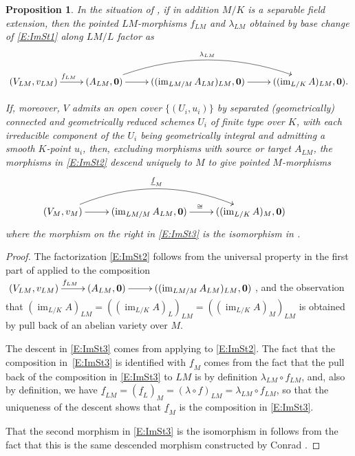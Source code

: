 \documentclass[11pt, reqno]{amsart}
\numberwithin{equation}{section}
\newtheorem{pro}[teo]{Proposition}
\theoremstyle{definition}
\theoremstyle{remark}
\DeclareMathOperator{\im}{im}
\def\iso{\cong}
\newcommand{\ubar}[1]{{\underline{#1}}}
\begin{document}
\begin{pro}\label{C:ImAbVarSt}
 In the situation of , 
  if in addition $M/K$ is a separable field extension, then the pointed $LM$-morphisms $f_{LM}$ and $\lambda_{LM}$ obtained by base change of \eqref{E:ImSt1} along $LM/L$ factor as 
\begin{equation}\label{E:ImSt2}
\xymatrix{
(V_{LM},v_{LM})\ar[r]^{f_{LM}} & (A_{LM},\mathbf 0) \ar@/^2pc/[rr]^<>(0.5){\lambda_{LM}}  \ar[r]& (( \im_{LM/M} A_{LM})_{LM},\mathbf 0)  \ar[r]&((\im_{L/K}A)_{LM},\mathbf 0).
}
\end{equation}

 If, moreover, $V$ admits an open cover $\{(U_i,u_i)\}$ by separated  (geometrically) connected
  and geometrically reduced schemes $U_i$ of finite type over $K$, with each irreducible component of the $U_i$ being geometrically integral and admitting a smooth $K$-point $u_i$,
  then, 
excluding morphisms with source or target $A_{LM}$,  the morphisms  in \eqref{E:ImSt2} descend uniquely to $M$ to give pointed $M$-morphisms 
\begin{equation}\label{E:ImSt3}
\xymatrix{
(V_{M},v_{M})\ar[r] \ar@/^2pc/[rr]^{\ubar f_M} & ( \im_{LM/M} A_{LM},\mathbf 0)  \ar[r]^\iso&((\im_{L/K}A)_{M},\mathbf 0)& 
}
\end{equation}
where the morphism on the right in \eqref{E:ImSt3} is the isomorphism in .
  \end{pro}
  
  
\begin{proof}
The factorization \eqref{E:ImSt2} follows from the universal property
in the first part of   applied to the composition 
$
\xymatrix{
(V_{LM},v_{LM})\ar[r]^{f_{LM}} & (A_{LM},\mathbf 0)  \ar[r]& (( \im_{LM/M} A_{LM})_{LM},\mathbf 0) }
$, and the observation that $(\im_{L/K}A)_{LM}= ((\im_{L/K}A)_{L})_{LM}= ((\im_{L/K}A)_{M})_{LM}$ is obtained by pull back of an abelian variety over $M$.  

The descent in \eqref{E:ImSt3} comes from applying   to \eqref{E:ImSt2}.   
The fact that the composition in~\eqref{E:ImSt3} is identified with $\ubar f_M$ comes from the fact that the pull back of the composition in \eqref{E:ImSt3} to $LM$ is by definition  $\lambda_{LM}\circ f_{LM}$, and, also by definition, we have $\ubar f_{LM} =(\ubar f_L)_M=(\lambda \circ f)_{LM}=  \lambda_{LM}\circ f_{LM}$, so that the uniqueness of the descent shows that $\ubar f_M$ is the composition in \eqref{E:ImSt3}.

That the second morphism in  \eqref{E:ImSt3} is the isomorphism in  follows from the fact that this is the same descended morphism constructed by Conrad   \cite[Thm.~5.4]{conradtrace}.
\end{proof}
\end{document}
